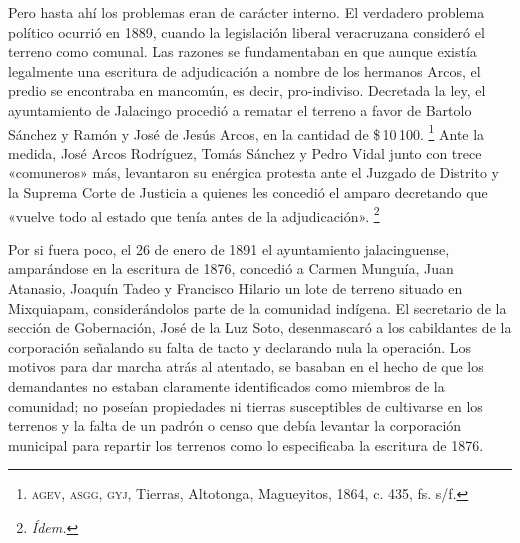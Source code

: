 \documentclass[14pt,twoside,final]{extbook} %
\let\oldfootnote\footnote
\renewcommand\footnote[1]{%
\oldfootnote{\hspace{1mm}#1}}
\begin{document}
Pero hasta ahí los problemas eran de carácter interno. El verdadero problema político ocurrió en 1889, cuando la legislación liberal veracruzana consideró el terreno como comunal. Las razones se fundamentaban en que aunque existía legalmente una escritura de adjudicación a nombre de los hermanos Arcos, el predio se encontraba en mancomún, es decir, pro-indiviso. Decretada la ley, el ayuntamiento de Jalacingo procedió a rematar el terreno a favor de Bartolo Sánchez y Ramón y José de Jesús Arcos, en la cantidad de \$\,10\,100.\footnote{\textsc{agev, asgg, gyj}, Tierras, Altotonga, Magueyitos, 1864, c. 435, fs. s/f.} Ante la medida, José Arcos Rodríguez, Tomás Sánchez y Pedro Vidal junto con trece «comuneros» más, levantaron su enérgica protesta ante el Juzgado de Distrito y la Suprema Corte de Justicia a quienes les concedió el amparo decretando que «vuelve todo al estado que tenía antes de la adjudicación».\footnote{\em Ídem.}

Por si fuera poco, el 26 de enero de 1891 el ayuntamiento jalacinguense, amparándose en la escritura de 1876, concedió a Carmen Munguía, Juan Atanasio, Joaquín Tadeo y Francisco Hilario un lote de terreno situado en Mixquiapam, considerándolos parte de la comunidad indígena. El secretario de la sección de Gobernación, José de la Luz Soto, desenmascaró a los cabildantes de la corporación señalando su falta de tacto y declarando nula la operación. Los motivos para dar marcha atrás al atentado, se basaban en el hecho de que los demandantes no estaban claramente identificados como miembros de la comunidad; no poseían propiedades ni tierras susceptibles de cultivarse en los terrenos y la falta de un padrón o censo que debía levantar la corporación municipal para repartir los terrenos como lo especificaba la escritura de 1876.
\end{document}
